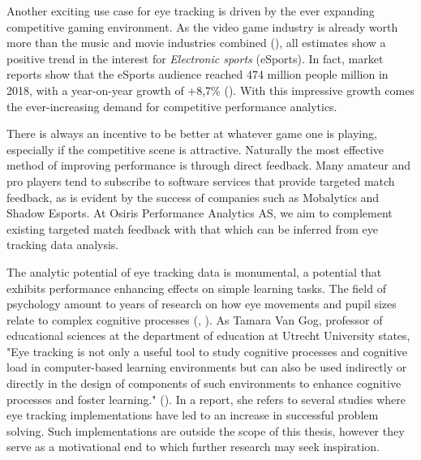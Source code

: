 Another exciting use case for eye tracking is driven by the ever expanding competitive gaming environment. As the video game industry is already worth more than the music and movie industries combined (\cite{mangeloja2019}), all estimates show a positive trend in the interest for \textit{Electronic sports} (eSports). In fact, market reports show that the eSports audience reached 474 million people million in 2018, with a year-on-year growth of +8,7\% (\cite{newzoo2021}). With this impressive growth comes the ever-increasing demand for competitive performance analytics. 

There is always an incentive to be better at whatever game one is playing, especially if the competitive scene is attractive. Naturally the most effective method of improving performance is through direct feedback. Many amateur and pro players tend to subscribe to software services that provide targeted match feedback, as is evident by the success of companies such as Mobalytics and Shadow Esports. At Osiris Performance Analytics AS, we aim to complement existing targeted match feedback with that which can be inferred from eye tracking data analysis.

The analytic potential of eye tracking data is monumental, a potential that exhibits performance enhancing effects on simple learning tasks. The field of psychology amount to years of research on how eye movements and pupil sizes relate to complex cognitive processes (\cite{may1990}, \cite{kahneman1966}). As Tamara Van Gog, professor of educational sciences at the department of education at Utrecht University states, "Eye tracking is not only a useful tool to study cognitive processes and cognitive load in computer-based learning environments but can also be used indirectly or directly in the design of components of such environments to enhance cognitive processes and foster learning." (\cite{vanGog2013}). In a report, she refers to several studies where eye tracking implementations have led to an increase in successful problem solving. Such implementations are outside the scope of this thesis, however they serve as a motivational end to which further research may seek inspiration.
